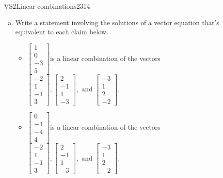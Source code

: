 \begin{exercise}{VS2}{Linear combinations}{2314} 
\begin{exerciseStatement} 

\begin{enumerate}[(a)]
\item  

 Write a statement involving the solutions of a vector equation that's equivalent to each claim below. 

 

\begin{itemize}
\item  

 \(\left[\begin{array}{c}
1 \\
0 \\
-3 \\
5
\end{array}\right]\)is a linear combination of the vectors \(\left[\begin{array}{c}
-2 \\
1 \\
-1 \\
3
\end{array}\right] , \left[\begin{array}{c}
2 \\
-1 \\
1 \\
-3
\end{array}\right] , \text{ and } \left[\begin{array}{c}
-3 \\
1 \\
2 \\
-2
\end{array}\right]\). 

 
\item  

 \(\left[\begin{array}{c}
0 \\
-1 \\
-4 \\
4
\end{array}\right]\)is a linear combination of the vectors \(\left[\begin{array}{c}
-2 \\
1 \\
-1 \\
3
\end{array}\right] , \left[\begin{array}{c}
2 \\
-1 \\
1 \\
-3
\end{array}\right] , \text{ and } \left[\begin{array}{c}
-3 \\
1 \\
2 \\
-2
\end{array}\right]\). 


\end{itemize}
\end{enumerate}
\end{exerciseStatement}
\end{exercise}

